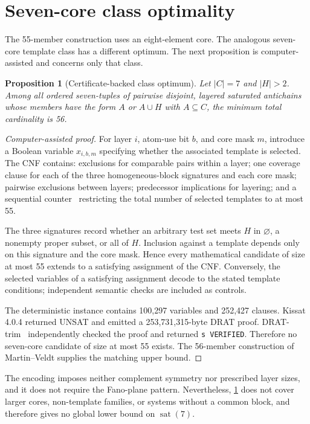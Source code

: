 \documentclass[a4paper,fleqn,longmktitle]{cas-sc}
\newtheorem{proposition}[theorem]{Proposition}
\theoremstyle{definition}
\theoremstyle{remark}
\newcommand{\sat}{\operatorname{sat}}
\begin{document}
\section{Seven-core class optimality}
\label{sec:class-optimality}

The 55-member construction uses an eight-element core.  The analogous
seven-core template class has a different optimum.  The next proposition is
computer-assisted and concerns only that class.

\begin{proposition}[Certificate-backed class optimum]
\label{prop:class-optimum}
Let $|C|=7$ and $|H|>2$.  Among all ordered seven-tuples of pairwise disjoint,
layered saturated antichains whose members have the form $A$ or $A\cup H$ with
$A\subseteq C$, the minimum total cardinality is 56.
\end{proposition}

\begin{proof}[Computer-assisted proof]
For layer $i$, atom-use bit $b$, and core mask $m$, introduce a Boolean
variable $x_{i,b,m}$ specifying whether the associated template is selected.
The CNF contains: exclusions for comparable pairs within a layer; one coverage
clause for each of the three homogeneous-block signatures and each core mask;
pairwise exclusions between layers; predecessor implications for layering;
and a sequential counter~\cite{sinz2005} restricting the total number of
selected templates to at most 55.

The three signatures record whether an arbitrary test set meets $H$ in
$\varnothing$, a nonempty proper subset, or all of $H$.  Inclusion against a
template depends only on this signature and the core mask.  Hence every
mathematical candidate of size at most 55 extends to a satisfying assignment
of the CNF\@.  Conversely, the selected variables of a satisfying assignment
decode to the stated template conditions; independent semantic checks are
included as controls.

The deterministic instance contains 100,297 variables and 252,427 clauses.
Kissat 4.0.4 returned UNSAT and emitted a 253,731,315-byte DRAT proof.
DRAT-trim~\cite{wetzler2014} independently checked the proof and returned
\texttt{s VERIFIED}.  Therefore no seven-core candidate of size at most 55
exists.  The 56-member construction of Martin--Veldt supplies the matching
upper bound.
\end{proof}

The encoding imposes neither complement symmetry nor prescribed layer sizes,
and it does not require the Fano-plane pattern.  Nevertheless,
\cref{prop:class-optimum} does not cover larger cores, non-template families,
or systems without a common block, and therefore gives no global lower bound
on $\sat(7)$.
\end{document}
